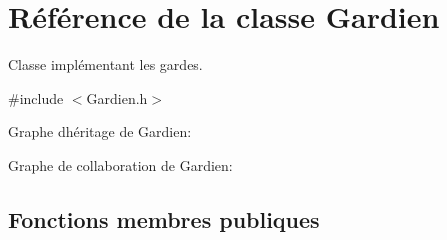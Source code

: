 \hypertarget{classGardien}{}\section{Référence de la classe Gardien}
\label{classGardien}


Classe implémentant les gardes.  




{\ttfamily \#include $<$Gardien.\+h$>$}



Graphe d\textquotesingle{}héritage de Gardien\+:


Graphe de collaboration de Gardien\+:
\subsection*{Fonctions membres publiques}
